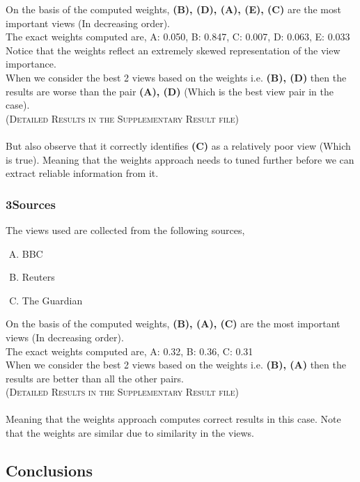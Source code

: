 \documentclass[a4paper]{article}
\begin{document}
	On the basis of the computed weights, \textbf{(B), (D), (A), (E), (C)} are the most important views (In decreasing order).\\
	The exact weights computed are,	\textsc{A: 0.050, B: 0.847, C: 0.007, D: 0.063, E: 0.033}\\
	Notice that the weights reflect an extremely skewed representation of the view importance. \\
	When we consider the best 2 views based on the weights i.e. \textbf{(B), (D)} then the results are worse than the pair \textbf{(A), (D)} (Which is the best view pair in the case).\\
	\null \hfill {\footnotesize{\textsc{(Detailed Results in the Supplementary Result file)}}}\\\\
	But also observe that it correctly identifies \textbf{(C)} as a relatively poor view (Which is true). Meaning that the weights approach needs to tuned further before we can extract reliable information from it.

	\subsubsection{3Sources}
	
	The views used are collected from the following sources,
	\vspace{-0.2cm}
	\begin{enumerate}[(A)]
	\setlength\itemsep{-0.05em}
		\item BBC
		\item Reuters
		\item The Guardian
	\end{enumerate}		

	On the basis of the computed weights, \textbf{(B), (A), (C)} are the most important views (In decreasing order).\\
	The exact weights computed are,	\textsc{A: 0.32, B:	0.36, C: 0.31}\\
	When we consider the best 2 views based on the weights i.e. \textbf{(B), (A)} then the results are better than all the other pairs.\\
	\null \hfill {\footnotesize{\textsc{(Detailed Results in the Supplementary Result file)}}}\\ \\
	Meaning that the weights approach computes correct results in this case. Note that the weights are similar due to similarity in the views.
	
	\subsection{Conclusions}
	
\end{document}
